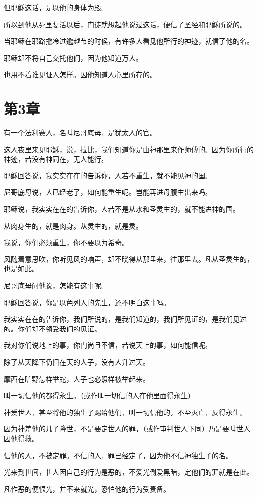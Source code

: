 \documentclass[12pt,oneside]{book}
\begin{document}
但耶稣这话，是以他的身体为殿。

所以到他从死里复活以后，门徒就想起他说过这话，便信了圣经和耶稣所说的。

当耶稣在耶路撒冷过逾越节的时候，有许多人看见他所行的神迹，就信了他的名。

耶稣却不将自己交托他们，因为他知道万人。

也用不着谁见证人怎样。因他知道人心里所存的。

\chapter{第3章}
有一个法利赛人，名叫尼哥底母，是犹太人的官。

这人夜里来见耶稣，说，拉比，我们知道你是由神那里来作师傅的。因为你所行的神迹，若没有神同在，无人能行。

耶稣回答说，我实实在在的告诉你，人若不重生，就不能见神的国。

尼哥底母说，人已经老了，如何能重生呢。岂能再进母腹生出来吗。

耶稣说，我实实在在的告诉你，人若不是从水和圣灵生的，就不能进神的国。

从肉身生的，就是肉身。从灵生的，就是灵。

我说，你们必须重生，你不要以为希奇。

风随着意思吹，你听见风的响声，却不晓得从那里来，往那里去。凡从圣灵生的，也是如此。

尼哥底母问他说，怎能有这事呢。

耶稣回答说，你是以色列人的先生，还不明白这事吗。

我实实在在的告诉你，我们所说的，是我们知道的，我们所见证的，是我们见过的。你们却不领受我们的见证。

我对你们说地上的事，你门尚且不信，若说天上的事，如何能信呢。

除了从天降下仍旧在天的人子，没有人升过天。

摩西在旷野怎样举蛇，人子也必照样被举起来。

叫一切信他的都得永生。（或作叫一切信的人在他里面得永生）

神爱世人，甚至将他的独生子赐给他们，叫一切信他的，不至灭亡，反得永生。

因为神差他的儿子降世，不是要定世人的罪，（或作审判世人下同）乃是要叫世人因他得救。

信他的人，不被定罪。不信的人，罪已经定了，因为他不信神独生子的名。

光来到世间，世人因自己的行为是恶的，不爱光倒爱黑暗，定他们的罪就是在此。

凡作恶的便恨光，并不来就光，恐怕他的行为受责备。
\end{document}
